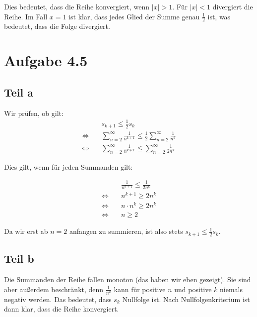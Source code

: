 \documentclass[a4paper,german,12pt,smallheadings]{scrartcl}
\begin{document}
Dies bedeutet, dass die Reihe konvergiert, wenn $|x| > 1$. Für $|x| < 1$
divergiert die Reihe. Im Fall $x = 1$ ist klar, dass jedes Glied der Summe
genau $\frac{1}{2}$ ist, was bedeutet, dass die Folge divergiert.

\section*{Aufgabe 4.5}
\subsection*{Teil a}

Wir prüfen, ob gilt:
\begin{align*}
  &s_{k+1} \le \frac{1}{2}s_k \\
  \Leftrightarrow\quad&\sum_{n=2}^{\infty} \frac{1}{n^{k+1}} \le \frac{1}{2} \sum_{n=2}^{\infty} \frac{1}{n^k} \\
  \Leftrightarrow\quad&\sum_{n=2}^{\infty} \frac{1}{n^{k+1}} \le \sum_{n=2}^{\infty} \frac{1}{2n^k}
\end{align*}

Dies gilt, wenn für jeden Summanden gilt:

\begin{align*}
  &\frac{1}{n^{k+1}} \le \frac{1}{2n^k} \\
  \Leftrightarrow\quad& n^{k+1} \ge 2n^k \\
  \Leftrightarrow\quad& n \cdot n^{k} \ge 2n^k \\
  \Leftrightarrow\quad& n \ge 2
\end{align*}

Da wir erst ab $n=2$ anfangen zu summieren, ist also stets $s_{k+1} \le \frac{1}{2}s_k$.

\subsection*{Teil b}
Die Summanden der Reihe fallen monoton (das haben wir eben gezeigt). Sie sind
aber außerdem beschränkt, denn $\frac{1}{n^k}$ kann für positive $n$ und
positive $k$ niemals negativ werden. Das bedeutet, dass $s_k$ Nullfolge ist.
Nach Nullfolgenkriterium ist dann klar, dass die Reihe konvergiert.
\end{document}
